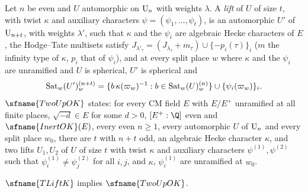 \begin{definition}\label{pf:galred:twoupdef}
Let $n$ be even and $U$ automorphic on $\mathrm{U}_n$ with weights $\lambda$. A \emph{lift} of $U$ of size $t$, with twist
$\kappa$ and auxiliary characters $\psi=(\psi_1,\dots,\psi_t)$, is an automorphic $U'$ of $\mathrm{U}_{n+t}$, with weights
$\lambda'$, such that $\kappa$ and the $\psi_i$ are algebraic Hecke characters of $E$, the Hodge--Tate multisets satisfy
$J_{\lambda'_\tau}=(J_{\lambda_\tau}+m_\tau)\cup\{-p_i(\tau)\}_i$ ($m$ the infinity type of $\kappa$, $p_i$ that of $\psi_i$), and
at every split place $w$ where $\kappa$ and the $\psi_i$ are unramified and $U$ is spherical, $U'$ is spherical and
\[
  \operatorname{Sat}_w(U')^{(n+t)}_w=\{b\,\kappa(\varpi_w)^{-1}:b\in\operatorname{Sat}_w(U)^{(n)}_w\}\cup\{\psi_i(\varpi_w)\}_i.
\]
$\sfname{TwoUpOK}$ states: for every CM field $E$ with $E/E^+$ unramified at all finite places, $\sqrt{-d}\in E$ for some
$d>0$, $[E^+:\Q]$ even and $\sfname{InertOK}(E)$, every even $n\ge1$, every automorphic $U$ of $\mathrm{U}_n$ and every split
place $w_0$, there are $t$ with $n+t$ odd, an algebraic Hecke character $\kappa$, and two lifts $U_1,U_2$ of $U$ of size $t$
with twist $\kappa$ and auxiliary characters $\psi^{(1)},\psi^{(2)}$ such that $\psi^{(1)}_i\ne\psi^{(2)}_j$ for all $i,j$, and
$\kappa$, $\psi^{(1)}_i$ are unramified at $w_0$.
\end{definition}

\begin{theorem}\label{pf:galred:twoup}
$\sfname{TLiftK}$ implies $\sfname{TwoUpOK}$.
\end{theorem}

